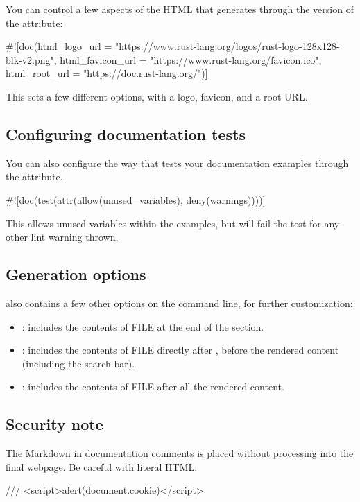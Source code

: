 You can control a few aspects of the HTML that  generates through the \code{\#![doc]} version of the attribute:

\begin{rustc}
#![doc(html_logo_url = "https://www.rust-lang.org/logos/rust-logo-128x128-blk-v2.png",
       html_favicon_url = "https://www.rust-lang.org/favicon.ico",
       html_root_url = "https://doc.rust-lang.org/")]
\end{rustc}

This sets a few different options, with a logo, favicon, and a root URL.

\subsection*{Configuring documentation tests}

You can also configure the way that  tests your documentation examples through the  attribute.

\begin{rustc}
#![doc(test(attr(allow(unused_variables), deny(warnings))))]
\end{rustc}

This allows unused variables within the examples, but will fail the test for any other lint warning thrown.

\subsection*{Generation options}

 also contains a few other options on the command line, for further customization:

\begin{itemize}
  \item{: includes the contents of FILE at the end of the  section.}
  \item{: includes the contents of FILE directly after , before the rendered 
      content (including the search bar).}
  \item{: includes the contents of FILE after all the rendered content.}
\end{itemize}

\subsection*{Security note}

The Markdown in documentation comments is placed without processing into the final webpage. Be careful with literal HTML:

\begin{rustc}
/// <script>alert(document.cookie)</script>
\end{rustc}
